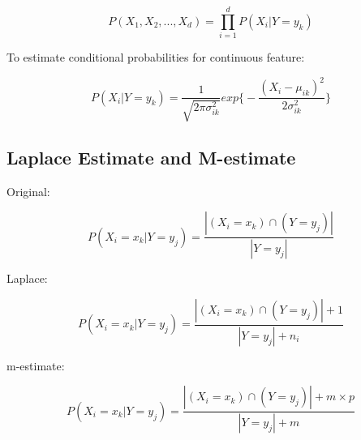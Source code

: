 \begin{multicols}{2}
$$P(X_1, X_2, ..., X_d) = \prod_{i=1}^{d} P(X_{i}|Y = y_{k})$$

\noindent To estimate conditional probabilities for continuous feature:

$$P(X_{i}| Y=y_{k}) = \frac{1}{\sqrt{2 \pi \sigma^{2}_{ik}}} exp \bigg\{ - \frac{(X_{i} - \mu_{ik})^{2} }{2 \sigma^{2}_{ik}} \bigg\}$$

\subsection{Laplace Estimate and M-estimate}

\noindent Original:

$$P(X_{i} = x_{k} | Y = y_{j}) = \frac{| (X_{i}=x_{k}) \cap (Y=y_{j}) |}{| Y=y_{j} |}$$

\noindent Laplace:

$$P(X_{i} = x_{k} | Y = y_{j}) = \frac{| (X_{i}=x_{k}) \cap (Y=y_{j}) | + 1}{| Y=y_{j} | + n_{i}}$$

\noindent m-estimate:

$$P(X_{i} = x_{k} | Y = y_{j}) = \frac{| (X_{i}=x_{k}) \cap (Y=y_{j}) |+m\times p}{| Y=y_{j} | + m}$$

\end{multicols}